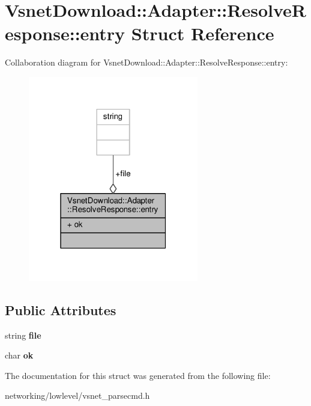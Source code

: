 \hypertarget{structVsnetDownload_1_1Adapter_1_1ResolveResponse_1_1entry}{}\section{Vsnet\+Download\+:\+:Adapter\+:\+:Resolve\+Response\+:\+:entry Struct Reference}
\label{structVsnetDownload_1_1Adapter_1_1ResolveResponse_1_1entry}


Collaboration diagram for Vsnet\+Download\+:\+:Adapter\+:\+:Resolve\+Response\+:\+:entry\+:
\nopagebreak
\begin{figure}[H]
\begin{center}
\leavevmode
\includegraphics[width=211pt]{d2/d56/structVsnetDownload_1_1Adapter_1_1ResolveResponse_1_1entry__coll__graph}
\end{center}
\end{figure}
\subsection*{Public Attributes}
\begin{DoxyCompactItemize}
\item 
string {\bfseries file}\hypertarget{structVsnetDownload_1_1Adapter_1_1ResolveResponse_1_1entry_a3858136803bdc3bf78cc758307347be2}{}\label{structVsnetDownload_1_1Adapter_1_1ResolveResponse_1_1entry_a3858136803bdc3bf78cc758307347be2}

\item 
char {\bfseries ok}\hypertarget{structVsnetDownload_1_1Adapter_1_1ResolveResponse_1_1entry_a28d1cdfeeb9d0495cb0b6ab46da56953}{}\label{structVsnetDownload_1_1Adapter_1_1ResolveResponse_1_1entry_a28d1cdfeeb9d0495cb0b6ab46da56953}

\end{DoxyCompactItemize}


The documentation for this struct was generated from the following file\+:\begin{DoxyCompactItemize}
\item 
networking/lowlevel/vsnet\+\_\+parsecmd.\+h\end{DoxyCompactItemize}
